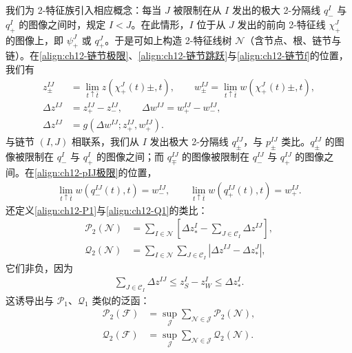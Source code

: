 \documentclass[../../main.tex]{subfiles}
\begin{document}
我们为 2-特征族引入相应概念：每当 $J$ 被限制在从 $I$ 发出的极大 2-分隔线 $q_-^I$ 与 $q_+^I$ 的图像之间时，规定 $I<J$。在此情形，$I$ 位于从 $J$ 发出的前向 2-特征线 $\chi_+^J$ 的图像上，即 $\psi_+^J$ 或 $q_+^J$。于是可如上构造 2-特征线树 $\mathscr{N}$（含节点、根、链节与链）。在\eqref{align:ch12-链节极限}、\eqref{align:ch12-链节跳跃}与\eqref{align:ch12-链节f}的位置，我们有
\begin{align}
z_\pm^{IJ}&=\lim_{t\uparrow\bar t}z(\chi_+^J(t)\pm,t),\qquad
w_\pm^{IJ}=\lim_{t\uparrow\bar t}w(\chi_+^J(t)\pm,t),
\label{align:ch12-链节极限2}\\
\Delta z^{IJ}&=z_+^{IJ}-z_-^{IJ},\qquad
\Delta w^{IJ}=w_+^{IJ}-w_-^{IJ},
\label{align:ch12-链节跳跃2}\\
\Delta z^{IJ}&=g(\Delta w^{IJ};z_+^{IJ},w_+^{IJ}).
\label{align:ch12-链节g}
\end{align}
与链节 $(I,J)$ 相联系，我们从 $I$ 发出极大 2-分隔线 $q_\pm^{IJ}$，与 $p_\pm^{IJ}$ 类比。$q_\pm^{IJ}$ 的图像被限制在 $q_-^I$ 与 $q_+^I$ 的图像之间；而 $q_\mp^{IJ}$ 的图像被限制在 $q_-^{IJ}$ 与 $q_+^{IJ}$ 的图像之间。在\eqref{align:ch12-pIJ极限}的位置，
\begin{align}
\lim_{t\uparrow\bar t}w(q_-^{IJ}(t),t)=w_-^{IJ},\qquad
\lim_{t\uparrow\bar t}w(q_+^{IJ}(t),t)=w_+^{IJ}.
\label{align:ch12-qIJ极限}
\end{align}
还定义\eqref{align:ch12-P1}与\eqref{align:ch12-Q1}的类比：
\begin{align}
\mathscr{P}_2(\mathscr{N})&=\sum_{I\in\mathscr{N}}\left[\Delta z_*^I-\sum_{J\in\mathscr{C}_I}\Delta z^{IJ}\right],
\label{align:ch12-P2}\\
\mathscr{Q}_2(\mathscr{N})&=\sum_{I\in\mathscr{N}}\sum_{J\in\mathscr{C}_I}|\Delta z^{IJ}-\Delta z_*^J|,
\label{align:ch12-Q2}
\end{align}
它们非负，因为
\begin{align}
\sum_{J\in\mathscr{C}_I}\Delta z^{IJ}\leqslant z_S^I-z_W^I\leqslant\Delta z_*^I.
\label{align:ch12-和非负2}
\end{align}
这诱导出与 $\mathscr{P}_1$、$\mathscr{Q}_1$ 类似的泛函：
\begin{align}
\mathscr{P}_2(\mathscr{F})&=\sup_{\mathscr{J}}\sum_{\mathscr{N}\in\mathscr{J}}\mathscr{P}_2(\mathscr{N}),
\label{align:ch12-P2F}\\
\mathscr{Q}_2(\mathscr{F})&=\sup_{\mathscr{J}}\sum_{\mathscr{N}\in\mathscr{J}}\mathscr{Q}_2(\mathscr{N}).
\label{align:ch12-Q2F}
\end{align}
\end{document}
